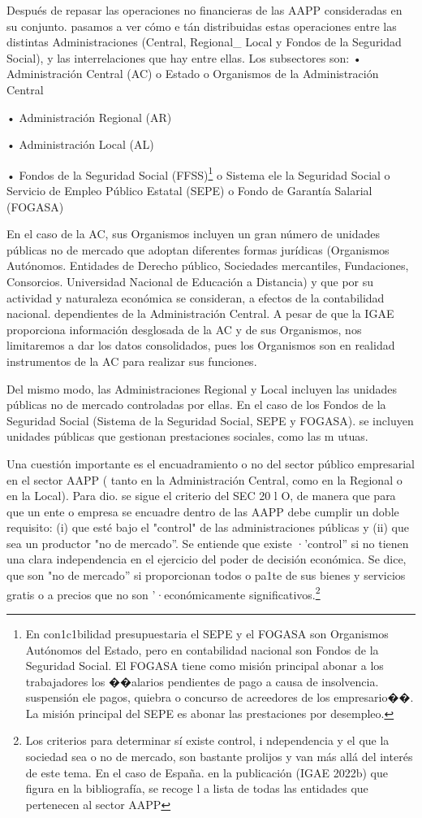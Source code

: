 \documentclass[10pt,a4paper]{article}
\begin{document}
Después de repasar las operaciones no financieras de las AAPP consideradas en su conjunto. pasamos a ver cómo e tán distribuidas estas operaciones entre las distintas Administraciones (Central, Regional_ Local y Fondos de la Seguridad Social), y las interrelaciones que hay entre ellas. Los subsectores son:
• Administración Central (AC)
o Estado
o Organismos de la Administración Central

• Administración Regional (AR)

• Administración Local (AL)

• Fondos de la Seguridad Social (FFSS)\footnote{%
    En con1c1bilidad presupuestaria el SEPE y el FOGASA son Organismos Autónomos del Estado, pero en contabilidad nacional son Fondos de la Seguridad Social. El FOGASA tiene como misión principal abonar a los trabajadores los ��alarios pendientes de pago a causa de insolvencia. suspensión ele pagos, quiebra o concurso de acreedores de los empresario��. La misión principal del SEPE es abonar las prestaciones por desempleo.
}
o Sistema ele la Seguridad Social
o Servicio de Empleo Público Estatal (SEPE) 
o Fondo de Garantía Salarial (FOGASA)

En el caso de la AC, sus Organismos incluyen un gran número de unidades públicas no de mercado que adoptan diferentes formas jurídicas (Organismos Autónomos. Entidades de Derecho público, Sociedades mercantiles, Fundaciones, Consorcios. Universidad Nacional de Educación a Distancia) y que por su actividad y naturaleza económica se consideran, a efectos de la contabilidad nacional. dependientes de la Administración Central. A pesar de que la IGAE proporciona información desglosada de la AC y de sus Organismos, nos limitaremos a dar los datos consolidados, pues los Organismos son en realidad instrumentos de la AC para realizar sus funciones.

Del mismo modo, las Administraciones Regional y Local incluyen las unidades públicas no de mercado controladas por ellas. En el caso de los Fondos de la Seguridad Social (Sistema de la Seguridad Social, SEPE y FOGASA). se incluyen unidades públicas que gestionan prestaciones sociales, como las m utuas.

Una cuestión importante es el encuadramiento o no del sector público empresarial en el sector AAPP ( tanto en la Administración Central, como en la Regional o en la Local). Para dio. se sigue el criterio del SEC 20 l O, de manera que para que un ente o empresa se encuadre dentro de las AAPP debe cumplir un doble requisito: (i) que esté bajo el "control" de las administraciones públicas y (ii) que sea un productor "no de mercado''. Se entiende que existe ·'control'' si no tienen una clara independencia en el ejercicio del poder de decisión económica. Se dice, que son "no de mercado'' si proporcionan todos o pa1te de sus bienes y servicios gratis o a precios que no son '·económicamente significativos.\footnote{%
    Los criterios para determinar sí existe control, i ndependencia y el que la sociedad sea o no de mercado, son bastante prolijos y van más allá del interés de este tema. En el caso de España. en la publicación (IGAE 2022b) que figura en la bibliografía, se recoge l a lista de todas las entidades que pertenecen al sector AAPP
}
\end{document}
